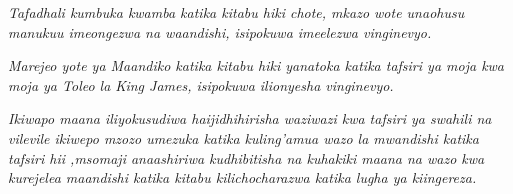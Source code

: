 \thispagestyle{empty}

\vspace*{1cm}

\begin{center}
    \textit{Tafadhali kumbuka kwamba katika kitabu hiki chote, mkazo wote unaohusu manukuu imeongezwa na waandishi, isipokuwa imeelezwa vinginevyo.}
    
    \textit{Marejeo yote ya Maandiko katika kitabu hiki yanatoka katika tafsiri ya moja kwa moja ya Toleo la King James, isipokuwa ilionyesha vinginevyo.}

    \textit{Ikiwapo maana iliyokusudiwa haijidhihirisha waziwazi kwa tafsiri ya swahili na vilevile ikiwepo mzozo umezuka katika kuling’amua wazo la mwandishi katika tafsiri hii ,msomaji anaashiriwa kudhibitisha na kuhakiki maana na wazo kwa kurejelea maandishi katika kitabu kilichocharazwa katika lugha ya kiingereza.}
\end{center}

\cleardoublepage